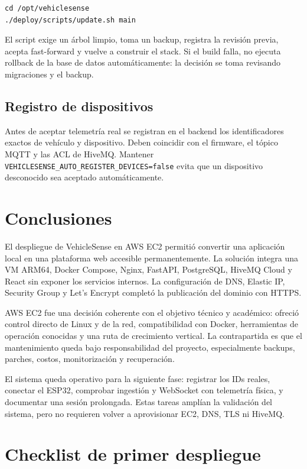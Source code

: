 \documentclass[12pt,a4paper,oneside]{report}
\newcommand{\code}[1]{\texttt{\small #1}}
\begin{document}
\begin{lstlisting}
cd /opt/vehiclesense
./deploy/scripts/update.sh main
\end{lstlisting}

El script exige un árbol limpio, toma un backup, registra la revisión previa,
acepta fast-forward y vuelve a construir el stack. Si el build falla, no ejecuta
rollback de la base de datos automáticamente: la decisión se toma revisando
migraciones y el backup.

\section{Registro de dispositivos}

Antes de aceptar telemetría real se registran en el backend los identificadores
exactos de vehículo y dispositivo. Deben coincidir con el firmware, el tópico MQTT
y las ACL de HiveMQ. Mantener \code{VEHICLESENSE\_AUTO\_REGISTER\_DEVICES=false}
evita que un dispositivo desconocido sea aceptado automáticamente.

\chapter{Conclusiones}

El despliegue de VehicleSense en AWS EC2 permitió convertir una aplicación local
en una plataforma web accesible permanentemente. La solución integra una VM ARM64,
Docker Compose, Nginx, FastAPI, PostgreSQL, HiveMQ Cloud y React sin exponer los
servicios internos. La configuración de DNS, Elastic IP, Security Group y
Let's Encrypt completó la publicación del dominio con HTTPS.

AWS EC2 fue una decisión coherente con el objetivo técnico y académico: ofreció
control directo de Linux y de la red, compatibilidad con Docker, herramientas de
operación conocidas y una ruta de crecimiento vertical. La contrapartida es que
el mantenimiento queda bajo responsabilidad del proyecto, especialmente backups,
parches, costos, monitorización y recuperación.

El sistema queda operativo para la siguiente fase: registrar los IDs reales,
conectar el ESP32, comprobar ingestión y WebSocket con telemetría física, y
documentar una sesión prolongada. Estas tareas amplían la validación del sistema,
pero no requieren volver a aprovisionar EC2, DNS, TLS ni HiveMQ.

\appendix
\chapter{Checklist de primer despliegue}
\end{document}

